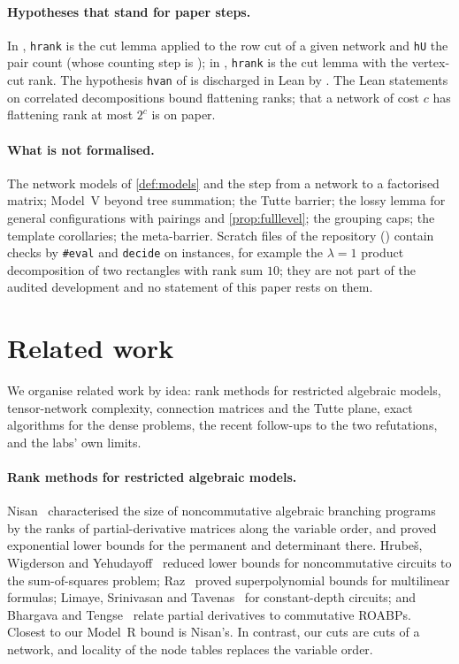 \documentclass[10pt]{amsart}
\theoremstyle{plain}
\theoremstyle{definition}
\theoremstyle{remark}
\numberwithin{equation}{section}
\begin{document}
\paragraph{Hypotheses that stand for paper steps.} In , \texttt{hrank} is the
cut lemma applied to the row cut of a given network and \texttt{hU} the pair count (whose counting
step is ); in , \texttt{hrank} is the cut lemma with
the vertex-cut rank. The hypothesis \texttt{hvan} of  is discharged in
Lean by . The Lean statements on correlated decompositions bound
flattening ranks; that a network of cost $c$ has flattening rank at most $2^c$ is on paper.

\paragraph{What is not formalised.} The network models of \cref{def:models} and the step from a network
to a factorised matrix; Model~V beyond tree summation; the Tutte barrier; the lossy lemma for general
configurations with pairings and \cref{prop:fulllevel}; the grouping caps; the template corollaries;
the meta-barrier. Scratch files of the repository () contain checks by
\texttt{\#eval} and \texttt{decide} on instances, for example the $\lambda=1$ product decomposition of two
rectangles with rank sum $10$; they are not part of the audited development and no statement of this
paper rests on them.

\section{Related work}\label{sec:related}

We organise related work by idea: rank methods for restricted algebraic models, tensor-network
complexity, connection matrices and the Tutte plane, exact algorithms for the dense problems, the
recent follow-ups to the two refutations, and the labs' own limits.

\paragraph{Rank methods for restricted algebraic models.} Nisan~\cite{Nisan91} characterised the size of
noncommutative algebraic branching programs by the ranks of partial-derivative matrices along the
variable order, and proved exponential lower bounds for the permanent and determinant there.
Hrube\v{s}, Wigderson and Yehudayoff~\cite{HWY11} reduced lower bounds for noncommutative circuits to
the sum-of-squares problem; Raz~\cite{Raz09} proved superpolynomial bounds for multilinear formulas;
Limaye, Srinivasan and Tavenas~\cite{LST21} for constant-depth circuits; and Bhargava and
Tengse~\cite{BhargavaTengse24} relate partial derivatives to commutative ROABPs. Closest to our
Model~R bound is Nisan's. In contrast, our cuts are cuts of a network, and locality of the node tables
replaces the variable order.
\end{document}
